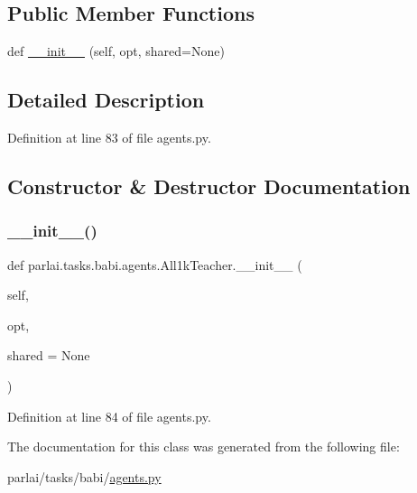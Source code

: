 \subsection*{Public Member Functions}
\begin{DoxyCompactItemize}
\item 
def \hyperlink{classparlai_1_1tasks_1_1babi_1_1agents_1_1All1kTeacher_ac78e7e860aad7926474025863ea9be4e}{\+\_\+\+\_\+init\+\_\+\+\_\+} (self, opt, shared=None)
\end{DoxyCompactItemize}


\subsection{Detailed Description}


Definition at line 83 of file agents.\+py.



\subsection{Constructor \& Destructor Documentation}
\mbox{\label{classparlai_1_1tasks_1_1babi_1_1agents_1_1All1kTeacher_ac78e7e860aad7926474025863ea9be4e}} 
\subsubsection{\texorpdfstring{\+\_\+\+\_\+init\+\_\+\+\_\+()}{\_\_init\_\_()}}
{\footnotesize\ttfamily def parlai.\+tasks.\+babi.\+agents.\+All1k\+Teacher.\+\_\+\+\_\+init\+\_\+\+\_\+ (\begin{DoxyParamCaption}\item[{}]{self,  }\item[{}]{opt,  }\item[{}]{shared = {\ttfamily None} }\end{DoxyParamCaption})}



Definition at line 84 of file agents.\+py.



The documentation for this class was generated from the following file\+:\begin{DoxyCompactItemize}
\item 
parlai/tasks/babi/\hyperlink{parlai_2tasks_2babi_2agents_8py}{agents.\+py}\end{DoxyCompactItemize}
